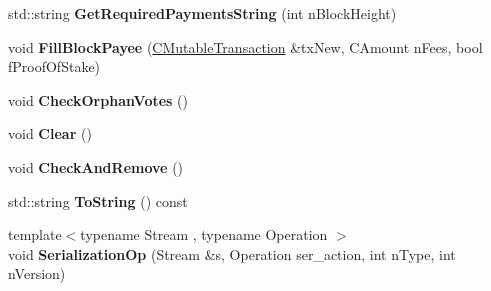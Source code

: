 \begin{DoxyCompactItemize}
\item 
\mbox{\label{class_c_budget_manager_aa7df3137c4b407fdbb474fcf602a67a5}} 
std\+::string {\bfseries Get\+Required\+Payments\+String} (int n\+Block\+Height)
\item 
\mbox{\label{class_c_budget_manager_aa52f3ff6c434fa5bf1a9e40d41bf4ade}} 
void {\bfseries Fill\+Block\+Payee} (\mbox{\hyperlink{struct_c_mutable_transaction}{C\+Mutable\+Transaction}} \&tx\+New, C\+Amount n\+Fees, bool f\+Proof\+Of\+Stake)
\item 
\mbox{\label{class_c_budget_manager_a73100cfcd156e567eab9e62eff332659}} 
void {\bfseries Check\+Orphan\+Votes} ()
\item 
\mbox{\label{class_c_budget_manager_a3a9115af29a10e955c2e1d50fd697411}} 
void {\bfseries Clear} ()
\item 
\mbox{\label{class_c_budget_manager_a6fcc03bb51d846ce2934d9f739080ba7}} 
void {\bfseries Check\+And\+Remove} ()
\item 
\mbox{\label{class_c_budget_manager_a6a618ea2000b15e58b68022781136454}} 
std\+::string {\bfseries To\+String} () const
\item 
\mbox{\label{class_c_budget_manager_a9749cf834f0877a49d3c0db0eb3b9a3c}} 
{\footnotesize template$<$typename Stream , typename Operation $>$ }\\void {\bfseries Serialization\+Op} (Stream \&s, Operation ser\+\_\+action, int n\+Type, int n\+Version)
\end{DoxyCompactItemize}
